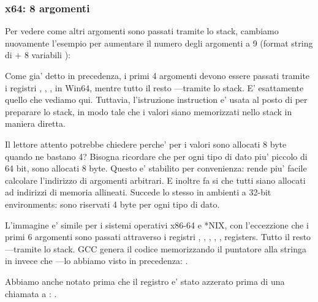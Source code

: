 \subsubsection{x64: 8 argomenti}

\label{example_printf8_x64}
Per vedere come altri argomenti sono passati tramite lo stack, cambiamo nuovamente l'esempio per aumentare il numero degli argomenti a 9 (format string di \printf + 8 variabili \Tint):




Come gia' detto in precedenza, i primi 4 argomenti devono essere passati tramite i registri \RCX, \RDX, ,  in Win64,
mentre tutto il resto ---tramite lo stack.
E' esattamente quello che vediamo qui.
Tuttavia, l'istruzione \MOV instruction e' usata al posto di \PUSH per preparare lo stack, in modo tale che i valori siano memorizzati
nello stack in maniera diretta.



Il lettore attento potrebbe chiedere perche' per i valori \Tint sono allocati 8 byte quando ne bastano 4?
Bisogna ricordare che per ogni tipo di dato piu' piccolo di 64 bit, sono allocati 8 byte.
Questo e' stabilito per convenienza: rende piu' facile calcolare l'indirizzo di argomenti arbitrari. E inoltre fa si che tutti
siano allocati ad indirizzi di memoria allineati.
Succede lo stesso in ambienti a 32-bit environments: sono riservati 4 byte per ogni tipo di dato.



L'immagine e' simile per i sistemi operativi x86-64 e *NIX, con l'eccezzione che i primi 6 argomenti sono passati attraverso
i registri \RDI, \RSI, \RDX, \RCX, ,  registers.
Tutto il resto ---tramite lo stack.
GCC genera il codice memorizzando il puntatore alla stringa in \EDI invece che \RDI{}---lo abbiamo visto in precedenza: 
.

Abbiamo anche notato prima che il registro \EAX e' stato azzerato prima di una chiamata a \printf: .



